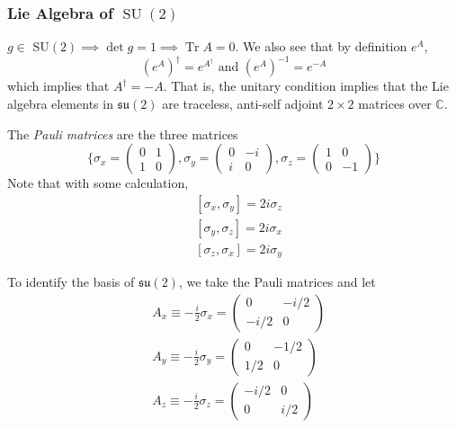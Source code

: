\documentclass{article}
\DeclareMathOperator{\Tr}{Tr}
\DeclareMathOperator{\SU}{SU}
\begin{document}
    \subsubsection[Lie Algebra of SU(2)]{Lie Algebra of \(\SU(2)\)}
    $g \in $ SU$(2) \implies \det{g} = 1 \implies \Tr{A} = 0$. We also see that by definition $e^A$, 
    \[(e^A)^\dagger = e^{A^\dagger} \text{ and } (e^A)^{-1} = e^{-A}\]
    which implies that $A^\dagger = - A$. That is, the unitary condition implies that the Lie algebra elements in $\mathfrak{su}(2)$ are traceless, anti-self adjoint $2 \times 2$ matrices over $\mathbb{C}$. 

    \begin{definition}
    The \textit{Pauli matrices} are the three matrices
    \[\bigg\{ \sigma_x = \begin{pmatrix}
    0&1\\1&0
    \end{pmatrix}, \sigma_y = \begin{pmatrix}
    0&-i\\i&0
    \end{pmatrix}, \sigma_z = \begin{pmatrix}
    1&0\\0&-1
    \end{pmatrix}\bigg\}\]
    Note that with some calculation, 
    \begin{align*}
        & [\sigma_x, \sigma_y] = 2 i \sigma_z \\
        & [\sigma_y, \sigma_z] = 2 i \sigma_x \\
        & [\sigma_z, \sigma_x] = 2 i \sigma_y
    \end{align*}
    \end{definition}
    To identify the basis of $\mathfrak{su}(2)$, we take the Pauli matrices and let 
    \begin{align*}
        & A_x \equiv - \frac{i}{2} \sigma_x = \begin{pmatrix} 0&-i/2\\-i/2&0 \end{pmatrix} \\
        & A_y \equiv - \frac{i}{2} \sigma_y = \begin{pmatrix}0&-1/2\\1/2&0\end{pmatrix} \\
        & A_z \equiv -\frac{i}{2} \sigma_z = \begin{pmatrix}-i/2&0\\0&i/2\end{pmatrix}
    \end{align*} 
\end{document}

